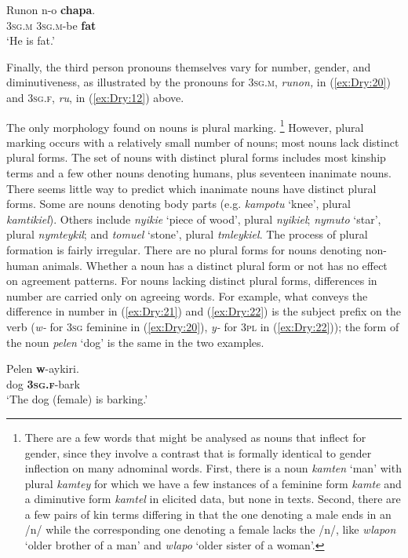 \documentclass[output=collectionpaper]{langsci/langscibook}
\begin{document}
\ea \label{ex:Dry:20}
\gll Runon	n-o	\textbf{chapa}.\\
\textsc{3sg.m} \textsc{3sg.m}-be \textbf{fat}\\
\glt `He is fat.'
\z

Finally, the third person pronouns themselves vary for number, gender, and diminutiveness, as illustrated by the pronouns for \textsc{3sg.m,} \textit{runon,} in (\ref{ex:Dry:20}) and \textsc{3sg.f}, \textit{ru}, in (\ref{ex:Dry:12}) above.

The only morphology found on nouns is plural marking.%
\footnote{There are a few words that might be analysed as nouns that inflect for gender, since they involve a contrast that is formally identical to gender inflection on many adnominal words. First, there is a noun \textit{kamten} `man' with plural \textit{kamtey} for which we have a few instances of a feminine form \textit{kamte} and a diminutive form \textit{kamtel} in elicited data, but none in texts. Second, there are a few pairs of kin terms differing in that the one denoting a male ends in an /n/ while the corresponding one denoting a female lacks the /n/, like \textit{wlapon} `older brother of a man' and \textit{wlapo} `older sister of a woman'.} %
However, plural marking occurs with a relatively small number of nouns; most nouns lack distinct plural forms. The set of nouns with distinct plural forms includes most kinship terms and a few other nouns denoting humans, plus seventeen inanimate nouns. There seems little way to predict which inanimate nouns have distinct plural forms. Some are nouns denoting body parts (e.g. \textit{kampotu} `knee', plural \textit{kamtikiel}). Others include \textit{nyikie} `piece of wood', plural \textit{nyikiel}; \textit{nymuto} `star', plural \textit{nymteykil}; and \textit{tomuel} `stone', plural \textit{tmleykiel}. The process of plural formation is fairly irregular. There are no plural forms for nouns denoting non-human animals. Whether a noun has a distinct plural form or not has no effect on agreement patterns. For nouns lacking distinct plural forms, differences in number are carried only on agreeing words. For example, what conveys the difference in number in (\ref{ex:Dry:21}) and (\ref{ex:Dry:22}) is the subject prefix on the verb (\textit{w-} for \textsc{3sg} feminine in (\ref{ex:Dry:20}), \textit{y-} for \textsc{3pl} in (\ref{ex:Dry:22})); the form of the noun \textit{pelen} `dog' is the same in the two examples.

\ea \label{ex:Dry:21}
\gll Pelen	\textbf{w}-aykiri.\\
dog \textbf{\textsc{3sg.f}}-bark\\
\glt  `The dog (female) is barking.'
\z
\end{document}
